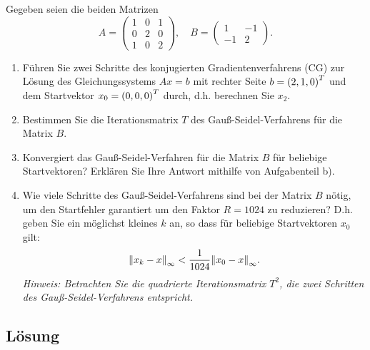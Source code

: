 \documentclass{exercise}
\begin{document}
    \begin{problem}
        Gegeben seien die beiden Matrizen
        \[
            A = \begin{pmatrix}
                1 & 0 & 1\\
                0 & 2 & 0\\
                1 & 0 & 2
            \end{pmatrix}, \quad B = \begin{pmatrix}
                1 & -1\\
                -1 & 2
            \end{pmatrix}.
        \]
        \begin{enumerate}
            \item Führen Sie zwei Schritte des konjugierten Gradientenverfahrens (CG) zur Lösung des Gleichungssystems \(Ax = b\) mit rechter Seite \(b = \parentheses*{2, 1, 0}^T\) und dem Startvektor \(x_0 = \parentheses*{0, 0, 0}^T\) durch, d.h. berechnen Sie \(x_2\).
            \item Bestimmen Sie die Iterationsmatrix \(T\) des Gauß-Seidel-Verfahrens für die Matrix \(B\).
            \item Konvergiert das Gauß-Seidel-Verfahren für die Matrix \(B\) für beliebige Startvektoren?
            Erklären Sie Ihre Antwort mithilfe von Aufgabenteil b).
            \item Wie viele Schritte des Gauß-Seidel-Verfahrens sind bei der Matrix \(B\) nötig, um den Startfehler garantiert um den Faktor \(R = 1024\) zu reduzieren?
            D.h. geben Sie ein möglichst kleines \(k\) an, so dass für beliebige Startvektoren \(x_0\) gilt:
            \[
                \norm*{x_k - x}_\infty < \frac{1}{1024}\norm*{x_0 - x}_\infty.
            \]
            \emph{Hinweis: Betrachten Sie die quadrierte Iterationsmatrix \(T^2\), die zwei Schritten des Gauß-Seidel-Verfahrens entspricht.}
        \end{enumerate}
    \end{problem}

    \subsection*{Lösung}
\end{document}
